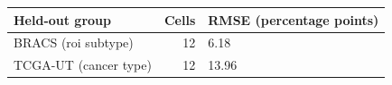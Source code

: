 \begin{tabular}{lrl}
\toprule
Held-out group & Cells & RMSE (percentage points) \\
\midrule
BRACS (roi subtype) & 12 & 6.18 \\
TCGA-UT (cancer type) & 12 & 13.96 \\
\bottomrule
\end{tabular}
